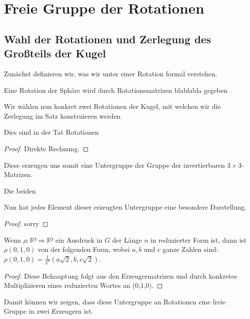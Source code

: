 \chapter{Freie Gruppe der Rotationen}


\section{Wahl der Rotationen und Zerlegung des Großteils der Kugel}

Zunächst definieren wir, was wir unter einer Rotation formal verstehen.
\begin{definition}[Rotationsmatrix]\label{def:rot}
Eine Rotation der Sphäre wird durch Rotationsmatrizen blablabla gegeben
\end{definition}


Wir wählen nun konkret zwei Rotationen der Kugel, mit welchen wir die Zerlegung im Satz konstruieren werden.

\begin{lemma}\label{lem:konk_rot_sind_rot}
Dies sind in der Tat Rotationen
\end{lemma}
\begin{proof}
Direkte Rechnung.
\end{proof}

Diese erzeugen uns somit eine Untergruppe der Gruppe der invertierbaren $3$-Matrizen.
\begin{definition}\label{def:konk_rot_erzeugt}
Die beiden
\end{definition}


Nun hat jedes Element dieser erzeugten Untergruppe eine besondere Darstellung.
\begin{lemma}\label{lem:darst_von_rot_matrix}
\end{lemma}
\begin{proof}
sorry
\end{proof}

\begin{lemma}\label{lem:darst_von_rot_res}
\leanok
Wenn $\rho : ³\Rightarrow{}³$ ein Ausdruck in $G$ der Länge 
$n$ in reduzierter Form ist, dann ist $\rho(0,1,0)$ von der folgenden Form, wobei
$a, b$ und $c$ ganze Zahlen sind: $\rho(0,1,0)=(a,b,c)$.
\end{lemma}
\begin{proof} 
\leanok Diese Behauptung folgt aus den Erzeugermatrizen
und durch konkretes Multiplizieren eines reduzierten Wortes an (0,1,0).
\end{proof}
Damit können wir zeigen, dass diese Untergruppe an Rotationen eine freie Gruppe in zwei Erzeugern ist.


